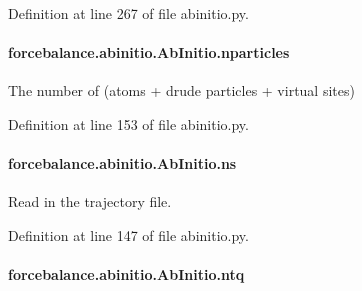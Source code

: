 Definition at line 267 of file abinitio.\-py.

\hypertarget{classforcebalance_1_1abinitio_1_1AbInitio_aef3798e4666b91ecc4c526b679eb4908}{
\paragraph[{nparticles}]{\setlength{\rightskip}{0pt plus 5cm}forcebalance.\-abinitio.\-Ab\-Initio.\-nparticles\hspace{0.3cm}{\ttfamily [inherited]}}}\label{classforcebalance_1_1abinitio_1_1AbInitio_aef3798e4666b91ecc4c526b679eb4908}


The number of (atoms + drude particles + virtual sites) 



Definition at line 153 of file abinitio.\-py.

\hypertarget{classforcebalance_1_1abinitio_1_1AbInitio_a1e8248e2efe952362b1b21462a70b540}{
\paragraph[{ns}]{\setlength{\rightskip}{0pt plus 5cm}forcebalance.\-abinitio.\-Ab\-Initio.\-ns\hspace{0.3cm}{\ttfamily [inherited]}}}\label{classforcebalance_1_1abinitio_1_1AbInitio_a1e8248e2efe952362b1b21462a70b540}


Read in the trajectory file. 



Definition at line 147 of file abinitio.\-py.

\hypertarget{classforcebalance_1_1abinitio_1_1AbInitio_af8a895f61ddea6b9ca2765ddbf309a75}{
\paragraph[{ntq}]{\setlength{\rightskip}{0pt plus 5cm}forcebalance.\-abinitio.\-Ab\-Initio.\-ntq\hspace{0.3cm}{\ttfamily [inherited]}}}\label{classforcebalance_1_1abinitio_1_1AbInitio_af8a895f61ddea6b9ca2765ddbf309a75}


